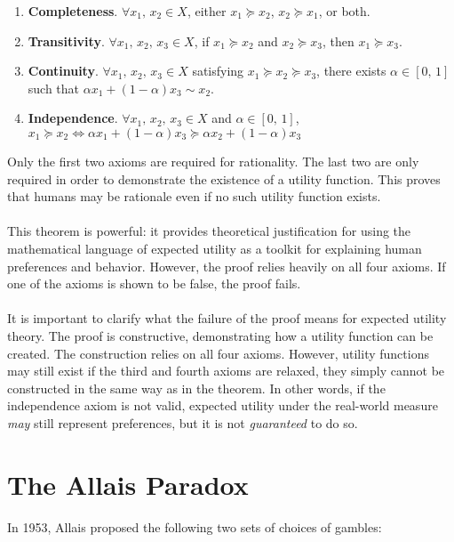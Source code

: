 \documentclass{article}
\begin{document}
\begin{enumerate}
	\item \textbf{Completeness}.  \(\forall x_1, \, x_2 \in X\), either \(x_1 \succeq  x_2\), \(x_2 \succeq  x_1\), or both.
	\item \textbf{Transitivity}.  \(\forall x_1, \, x_2,\, x_3 \in X\), if \(x_1 \succeq  x_2\) and \(x_2 \succeq  x_3\), then \(x_1 \succeq  x_3\).
	\item \textbf{Continuity}.  \(\forall x_1, \, x_2,\,x_3 \in X\) satisfying \(x_1 \succeq  x_2 \succeq  x_3\), there exists \(\alpha \in [0,\,1]\) such that \(\alpha x_1+(1-\alpha) x_3 \sim x_2\).
	\item \textbf{Independence}.  \(\forall x_1, \, x_2,\,x_3 \in X\) and \(\alpha \in [0,\,1]\), \(x_1 \succeq  x_2 \Leftrightarrow \alpha x_1+(1-\alpha)x_3 \succeq  \alpha x_2 +(1-\alpha)x_3\)
\end{enumerate}

Only the first two axioms are required for rationality.  The last two are only required in order to demonstrate the existence of a utility function.  This proves that humans may be rationale even if no such utility function exists.  
\\
\\
This theorem is powerful: it provides theoretical justification for using the mathematical language of expected utility as a toolkit for explaining human preferences and behavior.  However, the proof relies heavily on all four axioms.  If one of the axioms is shown to be false, the proof fails.  
\\
\\
It is important to clarify what the failure of the proof means for expected utility theory. The proof is constructive, demonstrating how a utility function can be created.  The construction relies on all four axioms.  However, utility functions may still exist if the third and fourth axioms are relaxed, they simply cannot be constructed in the same way as in the theorem.  In other words, if the independence axiom is not valid, expected utility under the real-world measure \emph{may} still represent preferences, but it is not \emph{guaranteed} to do so.  
 

\section{The Allais Paradox} 

In 1953, Allais proposed the following two sets of choices of gambles:
\end{document}

